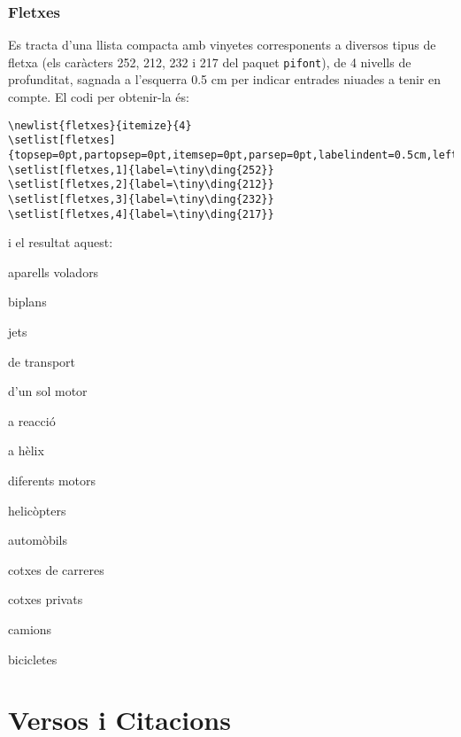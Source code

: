 \documentclass[a4paper,%
                             twoside,%
                             BCOR1.0cm,%
                             DIV11,%
                             parskip=full,%
                             11pt]{scrbook}
\begin{document}
\subsubsection{Fletxes}\label{ssbsec:fletxes}
Es tracta d'una llista compacta amb vinyetes corresponents a diversos tipus de fletxa (els caràcters 252, 212, 232 i 217 del paquet \verb+pifont+), de 4 nivells de profunditat,  sagnada a l'esquerra 0.5 cm per indicar  entrades niuades a tenir en compte. El codi per obtenir-la és:
\begin{tiny}
\begin{verbatim}
\newlist{fletxes}{itemize}{4}
\setlist[fletxes]{topsep=0pt,partopsep=0pt,itemsep=0pt,parsep=0pt,labelindent=0.5cm,leftmargin=*}
\setlist[fletxes,1]{label=\tiny\ding{252}}
\setlist[fletxes,2]{label=\tiny\ding{212}}
\setlist[fletxes,3]{label=\tiny\ding{232}}
\setlist[fletxes,4]{label=\tiny\ding{217}}
\end{verbatim}
\end{tiny}
i el resultat aquest:
\begin{fletxes}
\item aparells voladors
	\begin{fletxes}
		\item biplans
		\item jets
		\item de transport
			\begin{fletxes}
				\item d'un sol motor
					\begin{fletxes}
						\item a reacció
						\item a hèlix
					\end{fletxes}
				\item diferents motors
			\end{fletxes}
		\item helicòpters
	\end{fletxes}
\item automòbils
	\begin{fletxes}
		\item cotxes de carreres
		\item cotxes privats
		\item camions
\end{fletxes}
\item bicicletes
\end{fletxes}

\section{Versos i Citacions}\label{sec:quote}
\end{document}
